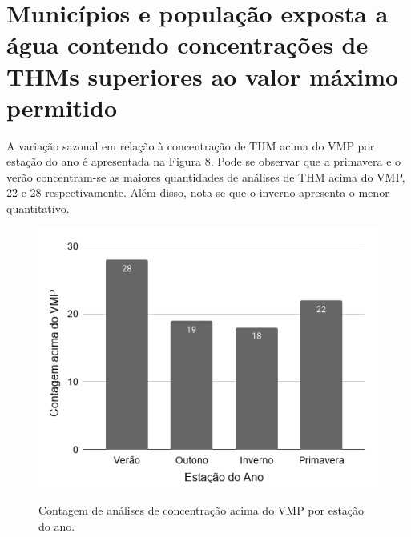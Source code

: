 \newpage

\section{Municípios e população exposta a água contendo concentrações de THMs superiores ao valor máximo permitido}

A variação sazonal em relação à concentração de THM acima do VMP por estação do ano é apresentada na Figura 8. Pode se observar que a primavera e o verão concentram-se as maiores quantidades de análises de THM acima do VMP, 22 e 28 respectivamente. Além disso, nota-se que o inverno apresenta o menor quantitativo. 


\begin{figure}[!htb]
\caption{\small Contagem de análises de concentração acima do VMP por estação do ano.}
\centering
\includegraphics[scale=0.55]{images/estação do ano.png}
\label{fig05}
\end{figure}



